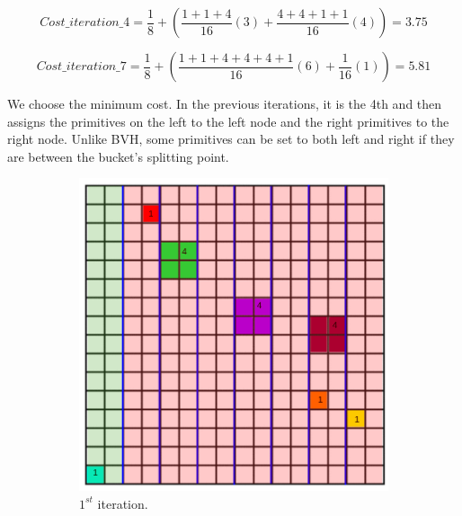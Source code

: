 \documentclass[11pt,a4paper]{article}
\begin{document}
\begin{equation}
Cost\_iteration\_4 =  \frac{1}{8} + (\frac{1+1+4}{16}(3) +\frac{4+4+1+1}{16}(4)) = 3.75
\end{equation}

\begin{equation}
Cost\_iteration\_7 =  \frac{1}{8} + (\frac{1+1+4+4+4+1}{16}(6) +\frac{1}{16}(1)) = 5.81
\end{equation}


We choose the minimum cost. In the previous iterations, it is the 4th and then assigns the primitives on the left to the left node and the right primitives to the right node. Unlike BVH, some primitives can be set to both left and right if they are between the bucket's splitting point.


\begin{figure}[H]	
     \centering
     \begin{subfigure}[b]{0.475\textwidth}
         \centering
         \includegraphics[width=\textwidth]{images/kdtree/grid_2.png}
         \caption{$1^{st} $ iteration.}
         \label{fig:pi_4000}
     \end{subfigure}
     \hfill
     \begin{subfigure}[b]{0.475\textwidth}
         \centering

\end{subfigure}
\end{figure}
\end{document}
